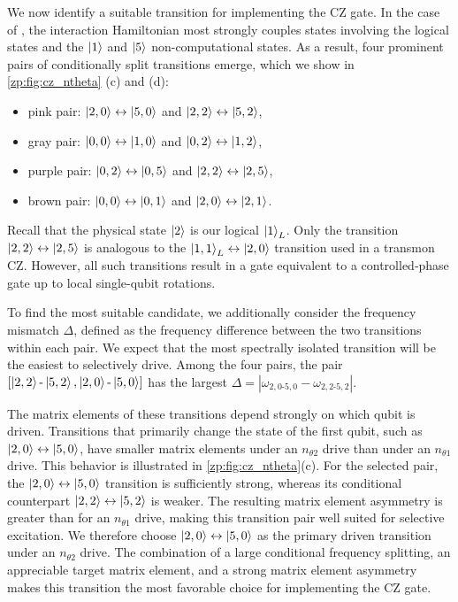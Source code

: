 We now identify a suitable transition for implementing the CZ gate.
In the case of \zp, the interaction Hamiltonian most strongly couples states involving the logical states and the $\ket{1}$ and $\ket{5}$ non-computational states.
As a result, four prominent pairs of conditionally split transitions emerge, which we show in \cref{zp:fig:cz_ntheta} (c) and (d):
\begin{itemize}
\item pink pair: $\ket{2,0}\leftrightarrow\ket{5,0}$ and $\ket{2,2}\leftrightarrow\ket{5,2}$,
\item  gray pair: $\ket{0,0}\leftrightarrow\ket{1,0}$ and $\ket{0,2}\leftrightarrow\ket{1,2}$,
\item purple pair: $\ket{0,2}\leftrightarrow\ket{0,5}$ and $\ket{2,2}\leftrightarrow\ket{2,5}$,
\item brown pair: $\ket{0,0}\leftrightarrow\ket{0,1}$ and $\ket{2,0}\leftrightarrow\ket{2,1}$.
\end{itemize}
Recall that the physical state $\ket{2}$ is our logical $\ket{1}_L$.
Only the transition $\ket{2,2}\leftrightarrow\ket{2,5}$ is analogous to the $\ket{1,1}_L \leftrightarrow \ket{2,0}$ transition used in a transmon CZ.
However, all such transitions result in a gate equivalent to a controlled-phase gate up to local single-qubit rotations.

To find the most suitable candidate, we additionally consider the frequency mismatch $\Delta$, defined as the frequency difference between the two transitions within each pair.
We expect that the most spectrally isolated transition will be the easiest to selectively drive.
Among the four pairs, the pair $[\ket{2,2} \text{-} \ket{5,2}, \ket{2,0} \text{-} \ket{5,0}]$ has the largest $\Delta = | \omega_{2,0 \text{-} 5,0} - \omega_{2,2 \text{-} 5,2} |$.

The matrix elements of these transitions depend strongly on which qubit is driven.
Transitions that primarily change the state of the first qubit, such as $\ket{2,0}\leftrightarrow\ket{5,0}$, have smaller matrix elements under an $n_{\theta2}$ drive than under an $n_{\theta1}$ drive.
This behavior is illustrated in \cref{zp:fig:cz_ntheta}(c).
For the selected pair, the $\ket{2,0}\leftrightarrow\ket{5,0}$ transition is sufficiently strong, whereas its conditional counterpart $\ket{2,2}\leftrightarrow\ket{5,2}$ is weaker.
The resulting matrix element asymmetry is greater than for an $n_{\theta1}$ drive, making this transition pair well suited for selective excitation.
We therefore choose $\ket{2,0}\leftrightarrow\ket{5,0}$ as the primary driven transition under an $n_{\theta2}$ drive.
The combination of a large conditional frequency splitting, an appreciable target matrix element, and a strong matrix element asymmetry makes this transition the most favorable choice for implementing the CZ gate.

